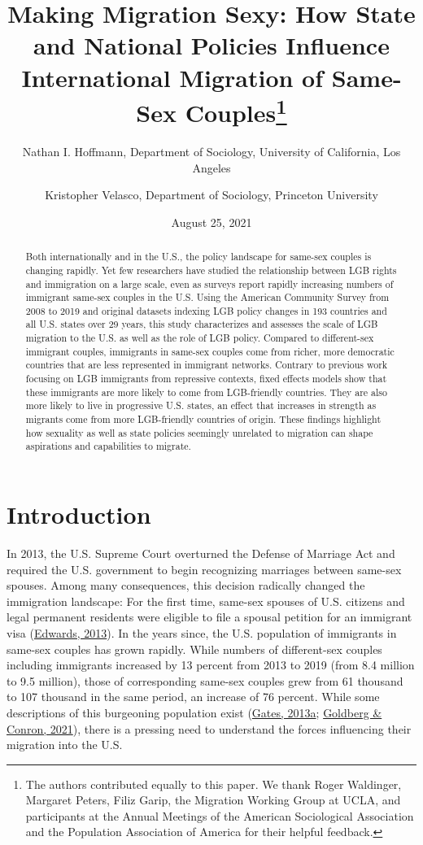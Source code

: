 \documentclass[
  11pt,
]{article}
\title{Making Migration Sexy: How State and National Policies Influence International Migration of Same-Sex Couples\thanks{The authors contributed equally to this paper. We thank Roger Waldinger, Margaret Peters, Filiz Garip, the Migration Working Group at UCLA, and participants at the Annual Meetings of the American Sociological Association and the Population Association of America for their helpful feedback.}}
\author{Nathan I. Hoffmann, Department of Sociology, University of California, Los Angeles \and Kristopher Velasco, Department of Sociology, Princeton University}
\date{August 25, 2021}
\begin{document}
\maketitle
\begin{abstract}
Both internationally and in the U.S., the policy landscape for same-sex couples is changing rapidly. Yet few researchers have studied the relationship between LGB rights and immigration on a large scale, even as surveys report rapidly increasing numbers of immigrant same-sex couples in the U.S. Using the American Community Survey from 2008 to 2019 and original datasets indexing LGB policy changes in 193 countries and all U.S. states over 29 years, this study characterizes and assesses the scale of LGB migration to the U.S. as well as the role of LGB policy. Compared to different-sex immigrant couples, immigrants in same-sex couples come from richer, more democratic countries that are less represented in immigrant networks. Contrary to previous work focusing on LGB immigrants from repressive contexts, fixed effects models show that these immigrants are more likely to come from LGB-friendly countries. They are also more likely to live in progressive U.S. states, an effect that increases in strength as migrants come from more LGB-friendly countries of origin. These findings highlight how sexuality as well as state policies seemingly unrelated to migration can shape aspirations and capabilities to migrate.
\end{abstract}

\hypertarget{introduction}{%
\section{Introduction}\label{introduction}}

In 2013, the U.S. Supreme Court overturned the Defense of Marriage Act and required the U.S. government to begin recognizing marriages between same-sex spouses. Among many consequences, this decision radically changed the immigration landscape: For the first time, same-sex spouses of U.S. citizens and legal permanent residents were eligible to file a spousal petition for an immigrant visa (\protect\hyperlink{ref-edwards_2013}{Edwards, 2013}). In the years since, the U.S. population of immigrants in same-sex couples has grown rapidly. While numbers of different-sex couples including immigrants increased by 13 percent from 2013 to 2019 (from 8.4 million to 9.5 million), those of corresponding same-sex couples grew from 61 thousand to 107 thousand in the same period, an increase of 76 percent. While some descriptions of this burgeoning population exist (\protect\hyperlink{ref-gates_2013}{Gates, 2013a}; \protect\hyperlink{ref-goldberg_2021}{Goldberg \& Conron, 2021}), there is a pressing need to understand the forces influencing their migration into the U.S.
\end{document}
